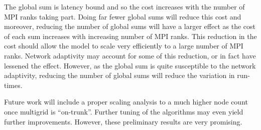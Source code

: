 The global sum is latency bound and so the cost increases with the
number of MPI ranks taking part. Doing far fewer global sums will
reduce this cost and moreover, reducing the number of global sums will
have a larger effect as the cost of each sum increases with increasing
number of MPI ranks. This reduction in the cost should
allow the model to scale very efficiently to a large number of MPI
ranks. Network adaptivity may account for some of this reduction, or
in fact have lessened the effect. However, as the global sum is quite
susceptible to the network adaptivity, reducing the number of global
sums will reduce the variation in run-times.

Future work will include a proper scaling analysis to a much higher
node count once multigrid is ``on-trunk''. Further tuning of the
algorithms may even yield further improvements. However, these
preliminary results are very promising.
 
